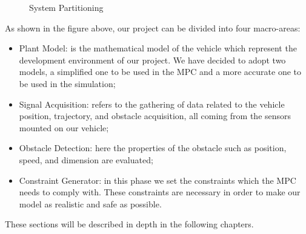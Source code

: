 \begin{figure}[H]
    \centering
    \caption{System Partitioning}
    \label{fig:partitioning}
\end{figure}

As shown in the figure above, our project can be divided into four macro-areas:
\begin{itemize}
    \item Plant Model: is the mathematical model of the vehicle which represent the development environment of our project. We have decided to adopt two models, a simplified one to be used in the MPC and a more accurate one to be used in the simulation; 
    \item Signal Acquisition: refers to the gathering of data related to the vehicle position, trajectory, and obstacle acquisition, all coming from the sensors mounted on our vehicle;
    \item Obstacle Detection: here the properties of the obstacle such as position, speed, and dimension  are evaluated;
    \item Constraint Generator: in this phase we set the constraints which the MPC needs to comply with. These constraints are necessary in order to make our model as realistic and safe as possible.
\end{itemize}

These sections will be described in depth in the following chapters.




